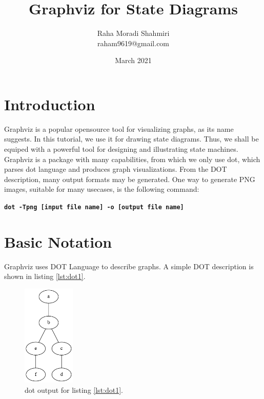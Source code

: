 \documentclass{article}
\title{Graphviz for State Diagrams}
\date{March 2021}
\author{Raha Moradi Shahmiri\\raham9619@gmail.com}
\begin{document}
	\maketitle
	\newpage
	\tableofcontents
	\newpage


	\section{Introduction}
	Graphviz is a popular opensource tool for visualizing graphs, as its name suggests. In this tutorial, we use it for drawing state diagrams. Thus, we shall be equiped with a powerful tool for designing and illustrating state machines. Graphviz is a package with many capabilities, from which we only use dot, which parses dot language and produces graph visualizations. 
	\newline
	From the DOT description, many output formats may be generated. One way to generate PNG images, suitable for many usecases, is the following command:
	\newline \newline
	
	\textbf{\lstinline{dot -Tpng [input file name] -o [output file name]}}

	\section{Basic Notation}
	Graphviz uses DOT Language to describe graphs. A simple DOT description is shown in listing \ref{lst:dot1}.

	
	
	\begin{figure}[H]
		\begin{center}
			\includegraphics[width=25mm]{figure1.png}
		\end{center}
		\caption{dot output for listing \ref{lst:dot1}.}
		\label{fig:png1}
	\end{figure}
\end{document}
